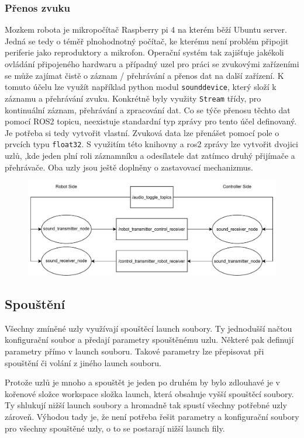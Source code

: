 \subsubsection*{Přenos zvuku}
Mozkem robota je mikropočítač Raspberry pi 4 na kterém běží Ubuntu server. Jedná se tedy o téměř plnohodnotný počítač, ke kterému není problém připojit periferie jako reproduktory a mikrofon. Operační systém tak zajišťuje jakékoli ovládání připojeného hardwaru a případný uzel pro práci se zvukovými zařízeními se může zajímat čistě o záznam / přehrávání a přenos dat na další zařízení. K tomuto účelu lze využít například python modul \verb|sounddevice|, který složí k záznamu a přehrávání zvuku. Konkrétně byly využity \verb|Stream| třídy, pro kontinuální záznam, přehrávání a zpracování dat. Co se týče přenosu těchto dat pomocí ROS2 topicu, neexistuje standardní typ zprávy pro tento účel definovaný. Je potřeba si tedy vytvořit vlastní. Zvuková data lze přenášet pomocí pole o prvcích typu \verb|float32|. S využitím této knihovny a ros2 zprávy lze vytvořit dvojici uzlů, ,kde jeden plní roli záznamníku a odesílatele dat zatímco druhý přijímače a přehrávače. Oba uzly jsou ještě doplněny o zastavovací mechanizmus.

\begin{figure}[h!]
	\centering
	\includegraphics[scale=0.75]{obrazky-figures/audio_transfer_diagram.pdf}
	\caption{}
	\label{}
\end{figure}

\subsection*{Spouštění}
Všechny zmíněné uzly využívají spouštěcí launch soubory. Ty jednodušší načtou konfigurační soubor a předají parametry spouštěnému uzlu. Některé pak definují parametry přímo v launch souboru. Takové parametry lze přepisovat při spouštění či volání z jiného launch souboru. 

Protože uzlů je mnoho a spouštět je jeden po druhém by bylo zdlouhavé je v kořenové složce workspace složka launch, která obsahuje vyšší spouštěcí soubory. Ty shlukují nižší launch soubory a hromadně tak spustí všechny potřebné uzly zároveň. Výhodou tady je, že není potřeba řešit parametry a konfigurační soubory pro všechny spouštěné uzly, o to se postarají nižší launch fily.

